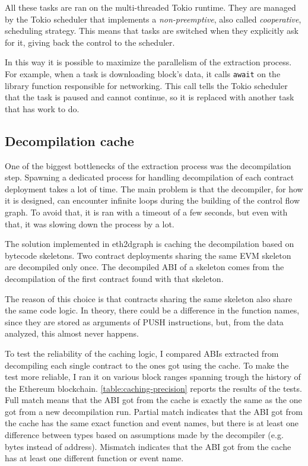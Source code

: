 All these tasks are ran on the multi-threaded Tokio runtime. They are managed by the Tokio scheduler that implements a \textit{non-preemptive}, also called \textit{cooperative}, scheduling strategy. This means that tasks are switched when they explicitly ask for it, giving back the control to the scheduler. 

In this way it is possible to maximize the parallelism of the extraction process. For example, when a task is downloading block's data, it calls \texttt{await} on the library function responsible for networking. This call tells the Tokio scheduler that the task is paused and cannot continue, so it is replaced with another task that has work to do.

\subsection{Decompilation cache}
\label{cachine-section}
One of the biggest bottlenecks of the extraction process was the decompilation step. Spawning a dedicated process for handling decompilation of each contract deployment takes a lot of time. The main problem is that the decompiler, for how it is designed, can encounter infinite loops during the building of the control flow graph. To avoid that, it is ran with a timeout of a few seconds, but even with that, it was slowing down the process by a lot.

The solution implemented in eth2dgraph is caching the decompilation based on bytecode skeletons. Two contract deployments sharing the same EVM skeleton are decompiled only once. The decompiled ABI of a skeleton comes from the decompilation of the first contract found with that skeleton.

The reason of this choice is that contracts sharing the same skeleton also share the same code logic. In theory, there could be a difference in the function names, since they are stored as arguments of PUSH instructions, but, from the data analyzed, this almost never happens.

To test the reliability of the caching logic, I compared ABIs extracted from decompiling each single contract to the ones got using the cache. To make the test more reliable, I ran it on various block ranges spanning trough the history of the Ethereum blockchain. \cref{table:caching-precision} reports the results of the tests. Full match means that the ABI got from the cache is exactly the same as the one got from a new decompilation run. Partial match indicates that the ABI got from the cache has the same exact function and event names, but there is at least one difference between types based on assumptions made by the decompiler (e.g. bytes instead of address). Mismatch indicates that the ABI got from the cache has at least one different function or event name.

